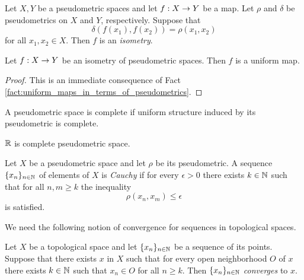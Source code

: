 \begin{definition}
	Let $X,Y$ be a pseudometric spaces and let $f:X\rightarrow Y$ be a map. Let $\rho$ and $\delta$ be pseudometrics on $X$ and $Y$, respectively. Suppose that
	$$\delta\left(f(x_1),f(x_2)\right) = \rho(x_1,x_2)$$
	for all $x_1,x_2 \in X$. Then $f$ is an \textit{isometry}.
\end{definition}

\begin{corollary}\label{corollary:isometries_are_uniform_maps}
	Let $f:X\rightarrow Y$ be an isometry of pseudometric spaces. Then $f$ is a uniform map.
\end{corollary}
\begin{proof}
	This is an immediate consequence of Fact \ref{fact:uniform_maps_in_terms_of_pseudometrics}.
\end{proof}

\begin{definition}
	A pseudometric space is complete if uniform structure induced by its pseudometric is complete.
\end{definition}

\begin{example}\label{example:real_line_is_complete}
	${\mathbb R}$ is complete pseudometric space.
\end{example}

\begin{definition}
	Let $X$ be a pseudometric space and let $\rho$ be its pseudometric. A sequence $\{x_n\}_{n \in {\mathbb N}}$ of elements of $X$ is \textit{Cauchy} if for every $\epsilon > 0$ there exists $k \in {\mathbb N}$ such that for all $n,m \geq k$ the inequality
	$$\rho(x_n,x_m) \leq \epsilon$$
	is satisfied.
\end{definition}
\noindent
We need the following notion of convergence for sequences in topological spaces.

\begin{definition}
	Let $X$ be a topological space and let $\{x_n\}_{n \in {\mathbb N}}$ be a sequence of its points. Suppose that there exists $x$ in $X$ such that for every open neighborhood $O$ of $x$ there exists $k \in {\mathbb N}$ such that $x_n \in O$ for all $n \geq k$. Then $\{x_n\}_{n\in {\mathbb N}}$ \textit{converges} to $x$.
\end{definition}


